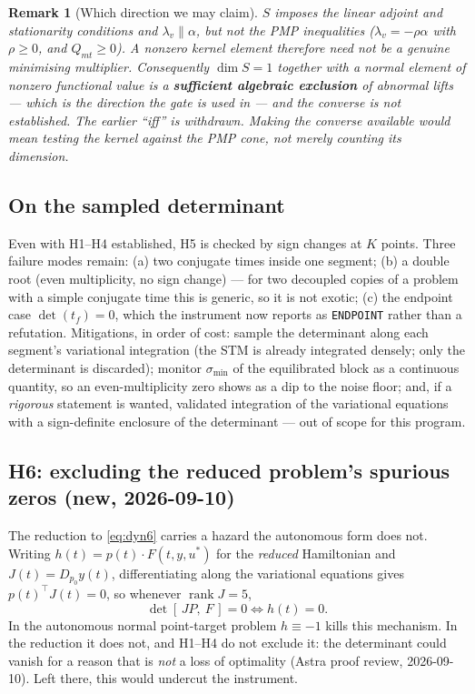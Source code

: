 \documentclass[11pt]{article}
\newtheorem{remark}{Remark}
\theoremstyle{definition}
\newcommand{\lv}{\lambda_v}
\newcommand{\tf}{t_f}
\begin{document}
\begin{remark}[Which direction we may claim]
$S$ imposes the linear adjoint and stationarity conditions and
$\lv\parallel\alpha$, but \emph{not} the PMP inequalities ($\lv=-\rho\alpha$
with $\rho\ge0$, and $Q_{mt}\ge0$). A nonzero kernel element therefore need not
be a genuine minimising multiplier. Consequently $\dim S=1$ together with a
normal element of nonzero functional value is a \textbf{sufficient algebraic
exclusion} of abnormal lifts --- which is the direction the gate is used in ---
and the converse is \emph{not} established. The earlier ``iff'' is withdrawn.
Making the converse available would mean testing the kernel against the PMP
cone, not merely counting its dimension.
\end{remark}

\subsection{On the sampled determinant}\label{sec:sampling}
Even with H1--H4 established, H5 is checked by sign changes at $K$ points.
Three failure modes remain: (a) two conjugate times inside one segment;
(b) a double root (even multiplicity, no sign change) --- for two decoupled
copies of a problem with a simple conjugate time this is generic, so it is not
exotic; (c) the endpoint case $\det(\tf)=0$, which the instrument now reports as
\texttt{ENDPOINT} rather than a refutation. Mitigations, in order of cost:
sample the determinant along each segment's variational integration (the STM
is already integrated densely; only the determinant is discarded);
monitor $\sigma_{\min}$ of the equilibrated block as a continuous quantity, so
an even-multiplicity zero shows as a dip to the noise floor; and, if a
\emph{rigorous} statement is wanted, validated integration of the variational
equations with a sign-definite enclosure of the determinant --- out of scope
for this program.

\subsection*{H6: excluding the reduced problem's spurious zeros (new, 2026-09-10)}
The reduction to \eqref{eq:dyn6} carries a hazard the autonomous form does not.
Writing $h(t)=p(t)\!\cdot\!F(t,y,u^{*})$ for the \emph{reduced} Hamiltonian and
$J(t)=D_{p_0}y(t)$, differentiating along the variational equations gives
$p(t)^{\top}J(t)=0$, so whenever $\operatorname{rank}J=5$,
\[
  \det[\,J P,\ F\,]=0 \iff h(t)=0 .
\]
In the autonomous normal point-target problem $h\equiv-1$ kills this mechanism.
In the reduction it does not, and H1--H4 do not exclude it: the determinant
could vanish for a reason that is \emph{not} a loss of optimality (Astra proof
review, 2026-09-10). Left there, this would undercut the instrument.
\end{document}
